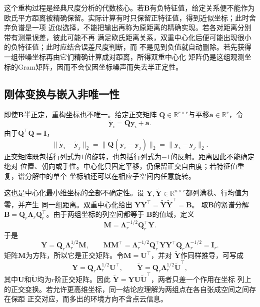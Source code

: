 这个重构过程是经典尺度分析的代数核心。若$\bm{B}$有负特征值，给定关系便不能作为
欧氏平方距离被精确保留。实际计算有时只保留正特征值，得到近似坐标；此时舍弃负谱是一项
近似选择，不能把输出再称为原距离的精确实现。若各对距离分别带有测量误差，彼此可能不再
满足欧氏距离关系，双重中心化后便可能出现很小的负特征值；此时应结合误差尺度判断，而
不是见到负值就自动删除。若先获得一组带噪坐标再由它们精确计算成对距离，所得双重中心化
矩阵仍是这组观测坐标的Gram矩阵，因而不会仅因坐标噪声而失去半正定性。

\subsection{刚体变换与嵌入非唯一性}

即使$\bm{B}$半正定，重构坐标也不唯一。给定正交矩阵
$\bm{Q}\in\mathbb{R}^{r\times r}$与平移$\bm{a}\in\mathbb{R}^r$，令
\[
  \widetilde{\bm{y}}_i
  =
  \bm{Q}\bm{y}_i+\bm{a}.
\]
由于$\bm{Q}^{\top}\bm{Q}=\bm{I}$，
\[
  \lVert\widetilde{\bm{y}}_i-\widetilde{\bm{y}}_j\rVert_2
  =
  \lVert\bm{Q}(\bm{y}_i-\bm{y}_j)\rVert_2
  =
  \lVert\bm{y}_i-\bm{y}_j\rVert_2.
\]
正交矩阵既包括行列式为$1$的旋转，也包括行列式为$-1$的反射。距离因此不能确定绝对
位置、朝向或手性。中心化只固定平移，仍保留正交自由度；若特征值重复，谱分解中的单个
坐标轴还可以在相应子空间内任意旋转。

这也是中心化最小维坐标的全部不确定性。设
$\bm{Y},\widetilde{\bm{Y}}\in\mathbb{R}^{n\times r}$都列满秩、行均值为零，并产生
同一组距离。双重中心化给出
$\bm{Y}\bm{Y}^{\top}=\widetilde{\bm{Y}}\widetilde{\bm{Y}}^{\top}=\bm{B}$。
取$\bm{B}$的紧谱分解
$\bm{B}=\bm{Q}_r\bm{\Lambda}_r\bm{Q}_r^{\top}$。由于两组坐标的列空间都等于
$\bm{B}$的值域，定义
\[
  \bm{M}
  =
  \bm{\Lambda}_r^{-1/2}\bm{Q}_r^{\top}\bm{Y}.
\]
于是
\[
  \bm{Y}
  =
  \bm{Q}_r\bm{\Lambda}_r^{1/2}\bm{M},
  \qquad
  \bm{M}\bm{M}^{\top}
  =
  \bm{\Lambda}_r^{-1/2}
  \bm{Q}_r^{\top}\bm{Y}\bm{Y}^{\top}\bm{Q}_r
  \bm{\Lambda}_r^{-1/2}
  =
  \bm{I}_r.
\]
矩阵$\bm{M}$为方阵，所以它是正交矩阵。令$\bm{M}=\bm{U}^{\top}$，并对
$\widetilde{\bm{Y}}$作同样推导，可写成
\[
  \bm{Y}=\bm{Q}_r\bm{\Lambda}_r^{1/2}\bm{U}^{\top},
  \qquad
  \widetilde{\bm{Y}}
  =\bm{Q}_r\bm{\Lambda}_r^{1/2}\widetilde{\bm{U}}^{\top},
\]
其中$\bm{U}$和$\widetilde{\bm{U}}$均为$r$阶正交矩阵。因此
$\widetilde{\bm{Y}}=\bm{Y}\bm{U}\widetilde{\bm{U}}^{\top}$，两者只差一个作用在坐标
列上的正交变换。若允许更高维坐标，同一结论应理解为两组点在各自张成空间之间存在保距
正交对应，而多出的环境方向不含点云信息。

